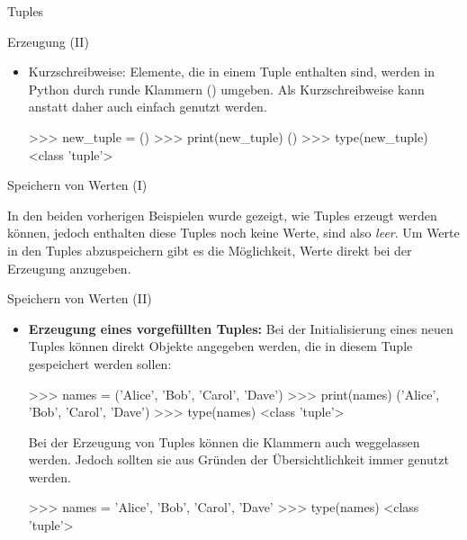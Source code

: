 \begin{subsection}{Tuples}
\begin{frame}[fragile]{Erzeugung (II)}
            \begin{itemize}
                \item Kurzschreibweise: Elemente, die in einem Tuple enthalten sind, werden in Python durch runde Klammern (\code{( )}) umgeben. Als Kurzschreibweise kann anstatt  daher auch einfach \code{()} genutzt werden.
                
\begin{pyconcode}
>>> new_tuple = ()
>>> print(new_tuple)
()
>>> type(new_tuple)
<class 'tuple'>
\end{pyconcode}                 
            \end{itemize}
        \end{frame}
        
        
        \begin{frame}[fragile]{Speichern von Werten (I)}
            
          In den beiden vorherigen Beispielen wurde gezeigt, wie Tuples erzeugt werden können, jedoch enthalten diese Tuples noch keine Werte, sind also \textit{leer}. Um Werte in den Tuples abzuspeichern gibt es die Möglichkeit, Werte direkt bei der Erzeugung anzugeben.
        \end{frame}
        
         \begin{frame}[fragile]{Speichern von Werten (II)}
         
         \begin{itemize}
             \item \textbf{Erzeugung eines vorgefüllten Tuples:} Bei der Initialisierung eines neuen Tuples können direkt Objekte angegeben werden, die in diesem Tuple gespeichert werden sollen: 

\begin{pyconcode}
>>> names = ('Alice', 'Bob', 'Carol', 'Dave')
>>> print(names)
('Alice', 'Bob', 'Carol', 'Dave')
>>> type(names)
<class 'tuple'>
\end{pyconcode}  
    
            Bei der Erzeugung von Tuples können die Klammern auch weggelassen werden. Jedoch sollten sie aus Gründen der Übersichtlichkeit immer genutzt werden.
            
\begin{pyconcode}
>>> names = 'Alice', 'Bob', 'Carol', 'Dave'
>>> type(names)
<class 'tuple'>
\end{pyconcode}  


         \end{itemize}
        \end{frame}
        

\end{subsection}
